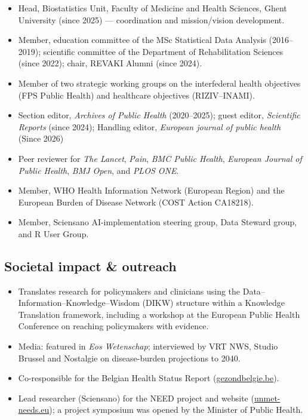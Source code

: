 \documentclass[
  letterpaper,
  DIV=11,
  numbers=noendperiod]{scrartcl}
\providecommand{\tightlist}{%
  \setlength{\itemsep}{0pt}\setlength{\parskip}{0pt}}\usepackage{longtable,booktabs,array}
\begin{document}
\begin{itemize}
\tightlist
\item
  Head, Biostatistics Unit, Faculty of Medicine and Health Sciences,
  Ghent University (since 2025) --- coordination and mission/vision
  development.
\item
  Member, education committee of the MSc Statistical Data Analysis
  (2016--2019); scientific committee of the Department of Rehabilitation
  Sciences (since 2022); chair, REVAKI Alumni (since 2024).
\item
  Member of two strategic working groups on the interfederal health
  objectives (FPS Public Health) and healthcare objectives
  (RIZIV--INAMI).
\item
  Section editor, \emph{Archives of Public Health} (2020--2025); guest
  editor, \emph{Scientific Reports} (since 2024); Handling editor,
  \emph{European journal of public health} (Since 2026)
\item
  Peer reviewer for \emph{The Lancet}, \emph{Pain}, \emph{BMC Public
  Health}, \emph{European Journal of Public Health}, \emph{BMJ Open},
  and \emph{PLOS ONE}.
\item
  Member, WHO Health Information Network (European Region) and the
  European Burden of Disease Network (COST Action CA18218).
\item
  Member, Sciensano AI-implementation steering group, Data Steward
  group, and R User Group.
\end{itemize}

\subsection{Societal impact \& outreach}\label{impact}

\begin{itemize}
\tightlist
\item
  Translates research for policymakers and clinicians using the
  Data--Information--Knowledge--Wisdom (DIKW) structure within a
  Knowledge Translation framework, including a workshop at the European
  Public Health Conference on reaching policymakers with evidence.
\item
  Media: featured in \emph{Eos Wetenschap}; interviewed by VRT NWS,
  Studio Brussel and Nostalgie on disease-burden projections to 2040.
\item
  Co-responsible for the Belgian Health Status Report
  (\href{https://www.gezondbelgie.be}{gezondbelgie.be}).
\item
  Lead researcher (Sciensano) for the NEED project and website
  (\href{https://unmet-needs.eu}{unmet-needs.eu}); a project symposium
  was opened by the Minister of Public Health.
\end{itemize}
\end{document}
